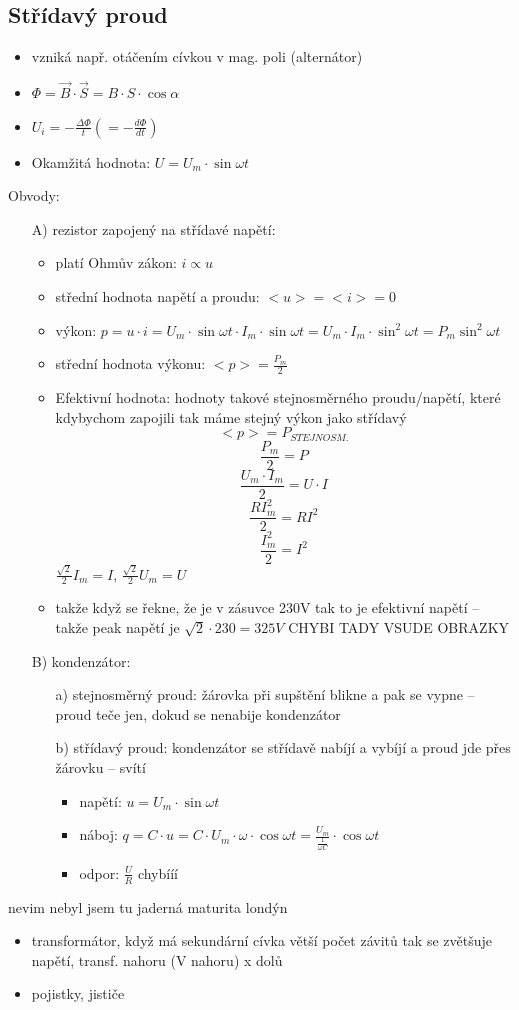 \documentclass{article}
\begin{document}
\subsection{Střídavý proud}
\begin{itemize}
  \item vzniká např. otáčením cívkou v mag. poli (alternátor)
  \item $\Phi = \overrightarrow{B} \cdot \overrightarrow{S} = B \cdot S \cdot \cos \alpha$
  \item $U_i = -\frac{\Delta \Phi}{t} (= -\frac{d \Phi}{dt})$
  \item Okamžitá hodnota: $U = U_m \cdot \sin \omega t$
\end{itemize}
Obvody:
\begin{itemize}
  \item[A)] rezistor zapojený na střídavé napětí:
  \begin{itemize}
    \item platí Ohmův zákon: $i \propto u$
    \item střední hodnota napětí a proudu: $<u> = <i> = 0$
    \item výkon: $p = u \cdot i = U_m \cdot \sin \omega t \cdot I_m \cdot \sin \omega t = U_m \cdot I_m \cdot \sin^2 \omega t = P_m \sin^2 \omega t$
    \item střední hodnota výkonu: $<p> = \frac{P_m}{2}$
    \item Efektivní hodnota: hodnoty takové stejnosměrného proudu/napětí, které kdybychom zapojili tak máme stejný výkon jako střídavý
    $$<p> = P_{STEJNOSM.}$$
    $$\frac{P_m}{2} = P$$
    $$\frac{U_m \cdot I_m}{2} = U \cdot I$$
    $$\frac{RI_m^2}{2} = RI^2$$
    $$\frac{I_m^2}{2} = I^2$$
    $\frac{\sqrt{2}}{2}I_m = I$, $\frac{\sqrt{2}}{2}U_m = U$
    \item takže když se řekne, že je v zásuvce 230V tak to je efektivní napětí -- takže peak napětí je $\sqrt{2} \cdot 230 = 325 V$  CHYBI TADY VSUDE OBRAZKY
  \end{itemize}
  \item[B)] kondenzátor:
  \begin{itemize}
    \item[a)] stejnosměrný proud: žárovka při supštění blikne a pak se vypne -- proud teče jen, dokud se nenabije kondenzátor
    \item[b)] střídavý proud: kondenzátor se střídavě nabíjí a vybíjí a proud jde přes žárovku -- svítí
    \begin{itemize}
      \item napětí: $u = U_m \cdot \sin \omega t$
      \item náboj: $q = C \cdot u = C \cdot U_m \cdot \omega \cdot \cos \omega t =  \frac{U_m}{\frac{1}{\omega C}} \cdot \cos \omega t$
      \item odpor: $\frac{U}{R}$ chybííí
    \end{itemize}
  \end{itemize}

\end{itemize}

nevim nebyl jsem tu jaderná maturita londýn

\begin{itemize}
  \item transformátor, když má sekundární cívka větší počet závitů tak se zvětšuje napětí, transf. nahoru (V nahoru) x dolů
  \item pojistky, jističe
\end{itemize}
\end{document}

